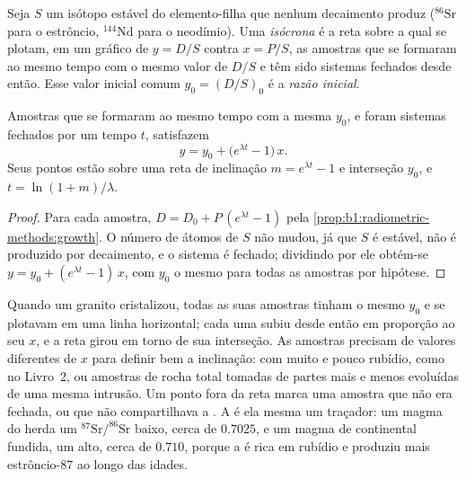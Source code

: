 \begin{definition}\label{def:b1:radiometric-methods:isochron}
Seja $S$ um isótopo estável do elemento-filha que nenhum decaimento produz ($^{86}\mathrm{Sr}$
para o estrôncio, $^{144}\mathrm{Nd}$ para o neodímio). Uma \emph{isócrona} é a
reta sobre a qual se plotam, em um gráfico de $y = D/S$ contra $x = P/S$, as amostras que se
formaram ao mesmo tempo com o mesmo valor de $D/S$ e têm sido sistemas fechados desde então.
Esse valor inicial comum $y_0 = (D/S)_0$ é a \emph{razão inicial}.
\end{definition}

\begin{theorem}[A isócrona]\label{thm:b1:radiometric-methods:isochron}
Amostras que se formaram ao mesmo tempo com a mesma  $y_0$, e foram sistemas
fechados por um tempo $t$, satisfazem
\[
  y = y_0 + \bigl(e^{\lambda t} - 1\bigr)\,x .
\]
Seus pontos estão sobre uma reta de inclinação $m = e^{\lambda t} - 1$ e interseção $y_0$, e
$t = \ln(1+m)/\lambda$.
\end{theorem}

\begin{proof}
Para cada amostra, $D = D_0 + P\,(e^{\lambda t} - 1)$ pela
\cref{prop:b1:radiometric-methods:growth}. O número de átomos de $S$ não mudou, já que $S$ é
estável, não é produzido por decaimento, e o sistema é fechado; dividindo por ele obtém-se
$y = y_0 + (e^{\lambda t} - 1)\,x$, com $y_0$ o mesmo para todas as amostras por hipótese.
\end{proof}

Quando um granito cristalizou, todas as suas amostras tinham o mesmo $y_0$ e se plotavam em uma
linha horizontal; cada uma subiu desde então em proporção ao seu $x$, e a reta girou em torno de
sua interseção. As amostras precisam de valores diferentes de $x$ para definir bem a
inclinação:  com muito e pouco rubídio, como no Livro~2, ou amostras de rocha total
tomadas de partes mais e menos evoluídas de uma mesma intrusão. Um ponto fora da reta marca uma
amostra que não era fechada, ou que não compartilhava a . A  é ela
mesma um traçador: um magma do  herda um $^{87}\mathrm{Sr}/^{86}\mathrm{Sr}$ baixo, cerca
de $0.7025$, e um magma de  continental fundida, um alto, cerca de $0.710$, porque a 
é rica em rubídio e produziu mais estrôncio-87 ao longo das idades.

